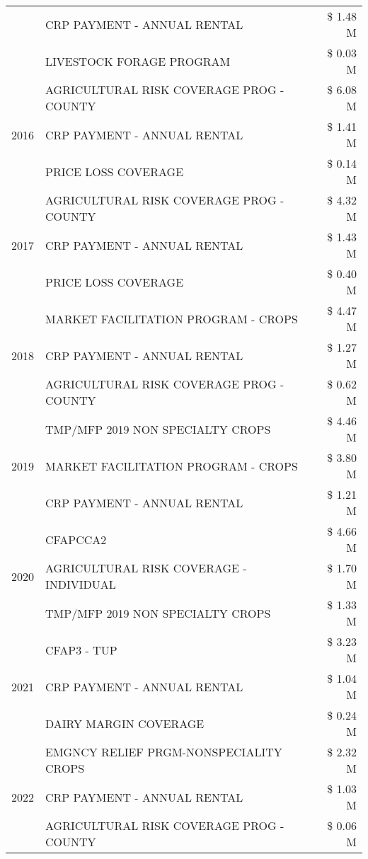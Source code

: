 \begin{tabular}{llr}
 & CRP PAYMENT - ANNUAL RENTAL & \$ 1.48 M \\
 & LIVESTOCK FORAGE PROGRAM & \$ 0.03 M \\
\cline{1-3}
\multirow[t]{3}{*}{2016} & AGRICULTURAL RISK COVERAGE PROG - COUNTY & \$ 6.08 M \\
 & CRP PAYMENT - ANNUAL RENTAL & \$ 1.41 M \\
 & PRICE LOSS COVERAGE & \$ 0.14 M \\
\cline{1-3}
\multirow[t]{3}{*}{2017} & AGRICULTURAL RISK COVERAGE PROG - COUNTY & \$ 4.32 M \\
 & CRP PAYMENT - ANNUAL RENTAL & \$ 1.43 M \\
 & PRICE LOSS COVERAGE & \$ 0.40 M \\
\cline{1-3}
\multirow[t]{3}{*}{2018} & MARKET FACILITATION PROGRAM - CROPS & \$ 4.47 M \\
 & CRP PAYMENT - ANNUAL RENTAL & \$ 1.27 M \\
 & AGRICULTURAL RISK COVERAGE PROG - COUNTY & \$ 0.62 M \\
\cline{1-3}
\multirow[t]{3}{*}{2019} & TMP/MFP 2019 NON SPECIALTY CROPS & \$ 4.46 M \\
 & MARKET FACILITATION PROGRAM - CROPS & \$ 3.80 M \\
 & CRP PAYMENT - ANNUAL RENTAL & \$ 1.21 M \\
\cline{1-3}
\multirow[t]{3}{*}{2020} & CFAPCCA2 & \$ 4.66 M \\
 & AGRICULTURAL RISK COVERAGE - INDIVIDUAL & \$ 1.70 M \\
 & TMP/MFP 2019 NON SPECIALTY CROPS & \$ 1.33 M \\
\cline{1-3}
\multirow[t]{3}{*}{2021} & CFAP3 - TUP & \$ 3.23 M \\
 & CRP PAYMENT - ANNUAL RENTAL & \$ 1.04 M \\
 & DAIRY MARGIN COVERAGE & \$ 0.24 M \\
\cline{1-3}
\multirow[t]{3}{*}{2022} & EMGNCY RELIEF PRGM-NONSPECIALITY CROPS & \$ 2.32 M \\
 & CRP PAYMENT - ANNUAL RENTAL & \$ 1.03 M \\
 & AGRICULTURAL RISK COVERAGE PROG - COUNTY & \$ 0.06 M \\
\cline{1-3}
\bottomrule
\end{tabular}
